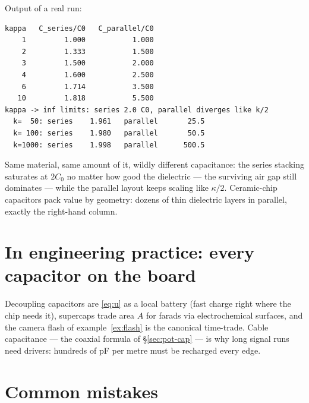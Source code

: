 Output of a real run:
\begin{lstlisting}[numbers=none]
kappa   C_series/C0   C_parallel/C0
    1         1.000           1.000
    2         1.333           1.500
    3         1.500           2.000
    4         1.600           2.500
    6         1.714           3.500
   10         1.818           5.500
kappa -> inf limits: series 2.0 C0, parallel diverges like k/2
  k=  50: series    1.961   parallel       25.5
  k= 100: series    1.980   parallel       50.5
  k=1000: series    1.998   parallel      500.5
\end{lstlisting}

Same material, same amount of it, wildly different capacitance: the
series stacking saturates at $2C_0$ no matter how good the dielectric
--- the surviving air gap still dominates --- while the parallel
layout keeps scaling like $\kappa/2$. Ceramic-chip capacitors pack
value by geometry: dozens of thin dielectric layers in parallel,
exactly the right-hand column.

\section{In engineering practice: every capacitor on the board}\label{sec:pot-eng}

Decoupling capacitors are \eqref{eq:u} as a local battery (fast charge
right where the chip needs it), supercaps trade area $A$ for farads via
electrochemical surfaces, and the camera flash of
example~\ref{ex:flash} is the canonical time-trade. Cable capacitance
--- the coaxial formula of \S\ref{sec:pot-cap} --- is why long signal
runs need drivers: hundreds of pF per metre must be recharged every
edge.

\section{Common mistakes}\label{sec:pot-mistakes}

